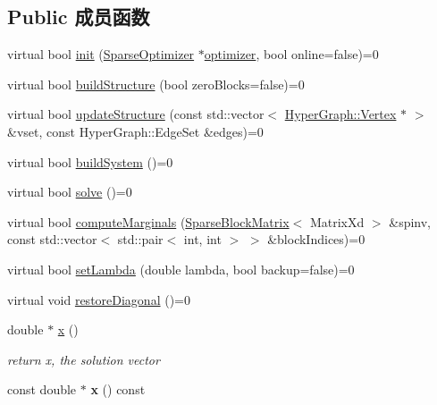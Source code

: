 \subsection*{Public 成员函数}
\begin{DoxyCompactItemize}
\item 
virtual bool \hyperlink{classg2o_1_1Solver_a532174e1ee53642880d2d59c128b037b}{init} (\hyperlink{classg2o_1_1SparseOptimizer}{Sparse\-Optimizer} $\ast$\hyperlink{classg2o_1_1Solver_a9ea585f131ab02ae1e0c0192126f0b5f}{optimizer}, bool online=false)=0
\item 
virtual bool \hyperlink{classg2o_1_1Solver_a6c93ac0f528ffe05867d33150c54f46f}{build\-Structure} (bool zero\-Blocks=false)=0
\item 
virtual bool \hyperlink{classg2o_1_1Solver_a035b8effea7178eabfb35e1c78b25987}{update\-Structure} (const std\-::vector$<$ \hyperlink{classg2o_1_1HyperGraph_1_1Vertex}{Hyper\-Graph\-::\-Vertex} $\ast$ $>$ \&vset, const Hyper\-Graph\-::\-Edge\-Set \&edges)=0
\item 
virtual bool \hyperlink{classg2o_1_1Solver_ac1565e85d5ca68a87ad7f06f8164a8c0}{build\-System} ()=0
\item 
virtual bool \hyperlink{classg2o_1_1Solver_a9c359a886db57f2f81e54a2113f3bd38}{solve} ()=0
\item 
virtual bool \hyperlink{classg2o_1_1Solver_afc33768e6c024e11d9e3c9d938b59b7f}{compute\-Marginals} (\hyperlink{classg2o_1_1SparseBlockMatrix}{Sparse\-Block\-Matrix}$<$ Matrix\-Xd $>$ \&spinv, const std\-::vector$<$ std\-::pair$<$ int, int $>$ $>$ \&block\-Indices)=0
\item 
virtual bool \hyperlink{classg2o_1_1Solver_a94a0d5196c7859c6c37fc2368ac56be3}{set\-Lambda} (double lambda, bool backup=false)=0
\item 
virtual void \hyperlink{classg2o_1_1Solver_a3c40dae9b999c4d18e57b02fd0e0ade2}{restore\-Diagonal} ()=0
\item 
\hypertarget{classg2o_1_1Solver_acb097d8568624a1f3af4dba808e5593b}{double $\ast$ \hyperlink{classg2o_1_1Solver_acb097d8568624a1f3af4dba808e5593b}{x} ()}\label{classg2o_1_1Solver_acb097d8568624a1f3af4dba808e5593b}

\begin{DoxyCompactList}\small\item\em return x, the solution vector \end{DoxyCompactList}\item 
\hypertarget{classg2o_1_1Solver_ad46ef97021dc9f694965adc613e37296}{const double $\ast$ {\bfseries x} () const }\label{classg2o_1_1Solver_ad46ef97021dc9f694965adc613e37296}


\end{DoxyCompactItemize}
